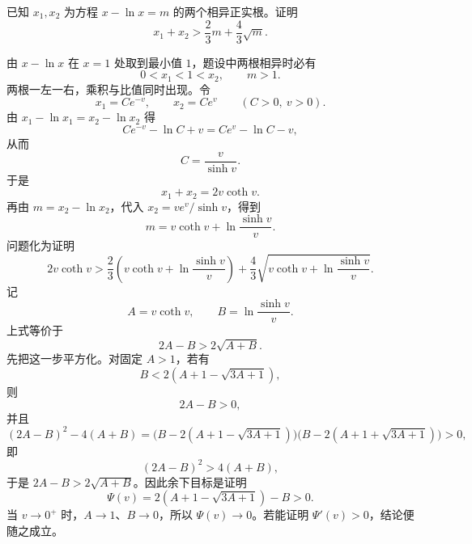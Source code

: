 \begin{example}
已知 \(x_1,x_2\) 为方程 \(x-\ln x=m\) 的两个相异正实根。证明
\[
x_1+x_2>\frac{2}{3}m+\frac{4}{3}\sqrt{m}.
\]
\end{example}
\begin{solution}
由 \(x-\ln x\) 在 \(x=1\) 处取到最小值 \(1\)，题设中两根相异时必有
\[
0<x_1<1<x_2,\qquad m>1.
\]
两根一左一右，乘积与比值同时出现。令
\[
x_1=Ce^{-v},\qquad x_2=Ce^v\qquad(C>0,\ v>0).
\]
由 \(x_1-\ln x_1=x_2-\ln x_2\) 得
\[
Ce^{-v}-\ln C+v=Ce^v-\ln C-v,
\]
从而
\[
C=\frac{v}{\sinh v}.
\]
于是
\[
x_1+x_2=2v\coth v.
\]
再由 \(m=x_2-\ln x_2\)，代入 \(x_2=ve^v/\sinh v\)，得到
\[
m=v\coth v+\ln\frac{\sinh v}{v}.
\]
问题化为证明
\[
2v\coth v>\frac23\left(v\coth v+\ln\frac{\sinh v}{v}\right)
+\frac43\sqrt{v\coth v+\ln\frac{\sinh v}{v}}.
\]
记
\[
A=v\coth v,\qquad B=\ln\frac{\sinh v}{v}.
\]
上式等价于
\[
2A-B>2\sqrt{A+B}.
\]
先把这一步平方化。对固定 \(A>1\)，若有
\[
B<2(A+1-\sqrt{3A+1}),
\]
则
\[
2A-B>0,
\]
并且
\[
(2A-B)^2-4(A+B)
=\bigl(B-2(A+1-\sqrt{3A+1})\bigr)
\bigl(B-2(A+1+\sqrt{3A+1})\bigr)>0,
\]
即
\[
(2A-B)^2>4(A+B),
\]
于是 \(2A-B>2\sqrt{A+B}\)。因此余下目标是证明
\[
\Psi(v)=2\left(A+1-\sqrt{3A+1}\right)-B>0.
\]
当 \(v\to0^+\) 时，\(A\to1\)、\(B\to0\)，所以 \(\Psi(v)\to0\)。若能证明 \(\Psi'(v)>0\)，结论便随之成立。


\end{solution}
